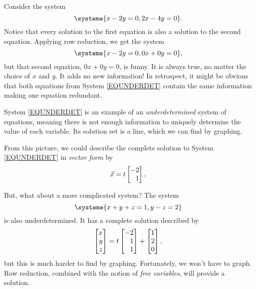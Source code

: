 	Consider the system
	\begin{equation}
		\label{EQUNDERDET}
		\systeme{x-2y=0,2x-4y=0}.
	\end{equation}
	Notice that every solution to the first equation is also a solution to the second equation.
	Applying row reduction, we get the system
	\[
		\systeme{x-2y=0,0x+0y=0},
	\]
	but that second equation, $0x+0y=0$, is funny. It is always true, no matter the choice of $x$ and $y$.
	It adds no new information! In retrospect, it might be obvious that both equations from System \eqref{EQUNDERDET}
	contain the same information making one equation redundant.

	System \eqref{EQUNDERDET} is an example of an \emph{underdetermined} system of equations, meaning 
	there is not enough information to uniquely determine the value of each variable.
	Its solution
	set is a line, which we can find by graphing.
	
	\begin{center}
	\end{center}

	From this picture, we could describe the complete solution to System \eqref{EQUNDERDET} in \emph{vector form} by
	\[
		\vec x = t\mat{-2\\1}.
	\]

	But, what about a more complicated system? The system
	\[
		\systeme{x+y+z=1,y-z=2}
	\]
	is also underdetermined. It has a complete solution described by
	\[
		\mat{x\\y\\z} =t\mat{-2\\1\\1} + \mat{1\\2\\0},
	\]
	but this is much harder to find by graphing.
	Fortunately, we won't have to graph. Row reduction, combined with the notion of \emph{free variables},
	will provide a solution.

